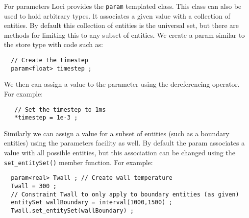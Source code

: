 \documentclass[10pt,epsf]{book}
\begin{document}
For parameters Loci provides the {\tt param} templated class.  This
class can also be used to hold arbitrary types.  It associates a given
value with a collection of entities.  By default this collection of
entities is the universal set, but there are methods for limiting this
to any subset of entities.  We create a param similar to the store
type with code such as:
\begin{verbatim}
  // Create the timestep
  param<float> timestep ;
\end{verbatim}
We then can assign a value to the parameter using the dereferencing
{\tt *} operator.  For example:
\begin{verbatim}
   // Set the timestep to 1ms
   *timestep = 1e-3 ;
\end{verbatim}
Similarly we can assign a value for a subset of entities (such as a
boundary entities) using the parameters facility as well.  By default
the param associates a value with all possible entities, but this
association can be changed using the {\tt set\_entitySet()} member
function.  For example:
\begin{verbatim}
  param<real> Twall ; // Create wall temperature
  Twall = 300 ;
  // Constraint Twall to only apply to boundary entities (as given)
  entitySet wallBoundary = interval(1000,1500) ; 
  Twall.set_entitySet(wallBoundary) ;
\end{verbatim}



\end{document}
